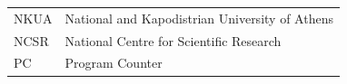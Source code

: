 \documentclass[ack,preface]{dithesis}
\begin{document}
\backmatter

\abbreviations
\begin{center}
	\renewcommand{\arraystretch}{1.5}
	\begin{longtable}{ l @{\qquad} l }
	\toprule
	NKUA    & National and Kapodistrian University of Athens\\
	NCSR & National Centre for Scientific Research \\
	PC & Program Counter \\
	\bottomrule
	\end{longtable}
\end{center}







\end{document}
